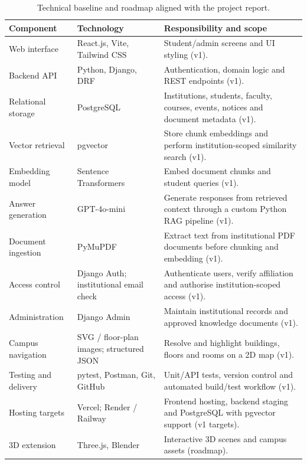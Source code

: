 \documentclass{tietreport}
\begin{document}
\begin{table}[htbp]
\centering
\small
\renewcommand{\arraystretch}{1.15}
\begin{tabularx}{\linewidth}{@{}>{\raggedright\arraybackslash}p{2.65cm}>{\raggedright\arraybackslash}p{3.65cm}Y@{}}
\toprule
\textbf{Component} & \textbf{Technology} & \textbf{Responsibility and scope} \\
\midrule
Web interface & React.js, Vite, Tailwind CSS & Student/admin screens and UI styling (v1). \\
Backend API & Python, Django, DRF & Authentication, domain logic and REST endpoints (v1). \\
Relational storage & PostgreSQL & Institutions, students, faculty, courses, events, notices and document metadata (v1). \\
Vector retrieval & pgvector & Store chunk embeddings and perform institution-scoped similarity search (v1). \\
Embedding model & Sentence Transformers & Embed document chunks and student queries (v1). \\
Answer generation & GPT-4o-mini & Generate responses from retrieved context through a custom Python RAG pipeline (v1). \\
Document ingestion & PyMuPDF & Extract text from institutional PDF documents before chunking and embedding (v1). \\
Access control & Django Auth; institutional email check & Authenticate users, verify affiliation and authorise institution-scoped access (v1). \\
Administration & Django Admin & Maintain institutional records and approved knowledge documents (v1). \\
Campus navigation & SVG / floor-plan images; structured JSON & Resolve and highlight buildings, floors and rooms on a 2D map (v1). \\
Testing and delivery & pytest, Postman, Git, GitHub & Unit/API tests, version control and automated build/test workflow (v1). \\
Hosting targets & Vercel; Render / Railway & Frontend hosting, backend staging and PostgreSQL with pgvector support (v1 targets). \\
3D extension & Three.js, Blender & Interactive 3D scenes and campus assets (roadmap). \\
\bottomrule
\end{tabularx}
\caption{Technical baseline and roadmap aligned with the project report.}
\label{tab:stack}
\end{table}
\end{document}
